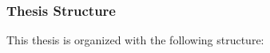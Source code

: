 \documentclass[11pt]{book}
\begin{document}











\subsubsection*{Thesis Structure}
This thesis is organized with the following structure:
\end{document}
